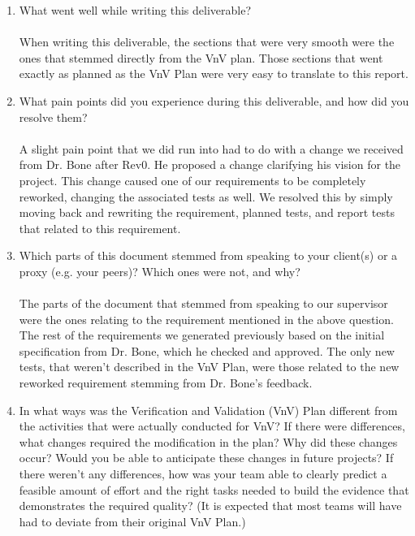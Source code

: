 \documentclass[12pt, titlepage]{article}
\begin{document}
\begin{enumerate}
  \item What went well while writing this deliverable? \\
  \\
  When writing this deliverable, the sections that were very smooth were the ones that stemmed directly from the VnV plan. Those sections that went exactly as planned as the VnV Plan were very easy to translate to this report.
  \item What pain points did you experience during this deliverable, and how
    did you resolve them? \\
  \\
  A slight pain point that we did run into had to do with a change we received from Dr. Bone after Rev0. He proposed a change clarifying his vision for the project. This change caused one of our requirements to be completely reworked, changing the associated tests as well. We resolved this by simply moving back and rewriting the requirement, planned tests, and report tests that related to this requirement.
  \item Which parts of this document stemmed from speaking to your client(s) or
  a proxy (e.g. your peers)? Which ones were not, and why?\\
  \\
  The parts of the document that stemmed from speaking to our supervisor were the ones relating to the requirement mentioned in the above question. The rest of the requirements we generated previously based on the initial specification from Dr. Bone, which he checked and approved. The only new tests, that weren't described in the VnV Plan, were those related to the new reworked requirement stemming from Dr. Bone's feedback.
  \item In what ways was the Verification and Validation (VnV) Plan different
  from the activities that were actually conducted for VnV?  If there were
  differences, what changes required the modification in the plan?  Why did
  these changes occur?  Would you be able to anticipate these changes in future
  projects?  If there weren't any differences, how was your team able to clearly
  predict a feasible amount of effort and the right tasks needed to build the
  evidence that demonstrates the required quality?  (It is expected that most
  teams will have had to deviate from their original VnV Plan.) \\
  \\

\end{enumerate}
\end{document}
